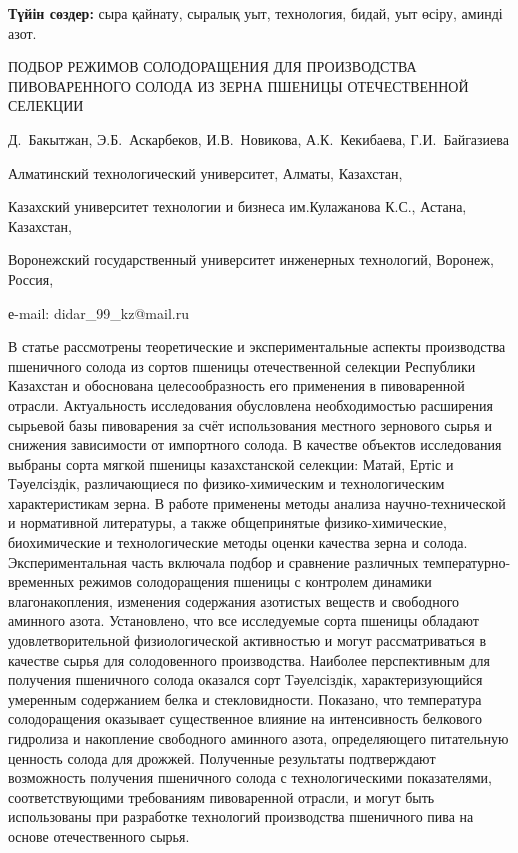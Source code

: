 {\bfseries Түйін сөздер:} сыра қайнату, сыралық уыт, технология, бидай, уыт
өсіру, аминді азот.

\begin{header}
ПОДБОР РЕЖИМОВ СОЛОДОРАЩЕНИЯ ДЛЯ ПРОИЗВОДСТВА ПИВОВАРЕННОГО СОЛОДА ИЗ ЗЕРНА ПШЕНИЦЫ ОТЕЧЕСТВЕННОЙ СЕЛЕКЦИИ

Д.~Бакытжан\envelope,
Э.Б.~Аскарбеков,
И.В.~Новикова,
А.К.~Кекибаева,
Г.И.~Байгазиева
\end{header}

\begin{affil}
Алматинский технологический университет, Алматы, Казахстан,

Казахский университет технологии и бизнеса им.Кулажанова К.С., Астана, Казахстан,

Воронежский государственный университет инженерных технологий, Воронеж, Россия,

е-mail: didar\_99\_kz@mail.ru
\end{affil}

В статье рассмотрены теоретические и экспериментальные аспекты
производства пшеничного солода из сортов пшеницы отечественной селекции
Республики Казахстан и обоснована целесообразность его применения в
пивоваренной отрасли. Актуальность исследования обусловлена
необходимостью расширения сырьевой базы пивоварения за счёт
использования местного зернового сырья и снижения зависимости от
импортного солода. В качестве объектов исследования выбраны сорта мягкой
пшеницы казахстанской селекции: Матай, Ертіс и Тәуелсіздік,
различающиеся по физико-химическим и технологическим характеристикам
зерна. В работе применены методы анализа научно-технической и
нормативной литературы, а также общепринятые физико-химические,
биохимические и технологические методы оценки качества зерна и солода.
Экспериментальная часть включала подбор и сравнение различных
температурно-временных режимов солодоращения пшеницы с контролем
динамики влагонакопления, изменения содержания азотистых веществ и
свободного аминного азота. Установлено, что все исследуемые сорта
пшеницы обладают удовлетворительной физиологической активностью и могут
рассматриваться в качестве сырья для солодовенного производства.
Наиболее перспективным для получения пшеничного солода оказался сорт
Тәуелсіздік, характеризующийся умеренным содержанием белка и
стекловидности. Показано, что температура солодоращения оказывает
существенное влияние на интенсивность белкового гидролиза и накопление
свободного аминного азота, определяющего питательную ценность солода для
дрожжей. Полученные результаты подтверждают возможность получения
пшеничного солода с технологическими показателями, соответствующими
требованиям пивоваренной отрасли, и могут быть использованы при
разработке технологий производства пшеничного пива на основе
отечественного сырья.

